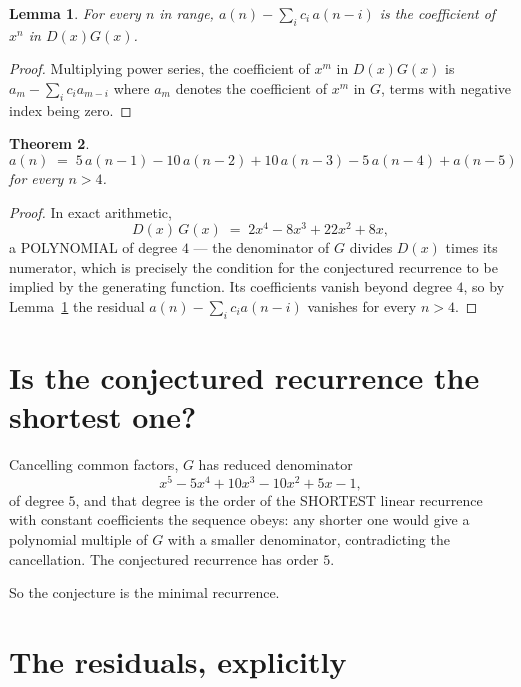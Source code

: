 \documentclass[11pt,a4paper]{article}
\theoremstyle{plain}
\newtheorem{theorem}{Theorem}
\newtheorem{lemma}[theorem]{Lemma}
\theoremstyle{definition}
\begin{document}
\begin{lemma}\label{lem:key}
For every $n$ in range, $a(n)-\sum_i c_i\,a(n-i)$ is the coefficient of $x^{n}$ in
$D(x)G(x)$.
\end{lemma}

\begin{proof}
Multiplying power series, the coefficient of $x^{m}$ in $D(x)G(x)$ is
$a_m-\sum_i c_i a_{m-i}$ where $a_m$ denotes the coefficient of $x^{m}$ in $G$, terms with
negative index being zero.
\end{proof}

\begin{theorem}
\[
a(n)\;=\;5\,a(n-1) - 10\,a(n-2) + 10\,a(n-3) - 5\,a(n-4) + a(n-5)
\]
for every $n>4$.
\end{theorem}

\begin{proof}
In exact arithmetic,
\[
D(x)\,G(x)\;=\;2 x^{4} - 8 x^{3} + 22 x^{2} + 8 x,
\]
a POLYNOMIAL of degree $4$ --- the denominator of $G$ divides $D(x)$ times its numerator,
which is precisely the condition for the conjectured recurrence to be implied by the
generating function. Its coefficients vanish beyond degree $4$, so by
Lemma~\ref{lem:key} the residual $a(n)-\sum_ic_ia(n-i)$ vanishes for every
$n>4$.
\end{proof}

\section{Is the conjectured recurrence the shortest one?}

Cancelling common factors, $G$ has reduced denominator
\[
x^{5} - 5 x^{4} + 10 x^{3} - 10 x^{2} + 5 x - 1,
\]
of degree $5$, and that degree is the order of the SHORTEST linear recurrence with
constant coefficients the sequence obeys: any shorter one would give a polynomial multiple of
$G$ with a smaller denominator, contradicting the cancellation. The conjectured recurrence has
order $5$.

So the conjecture is the minimal recurrence.

\section{The residuals, explicitly}
\end{document}
